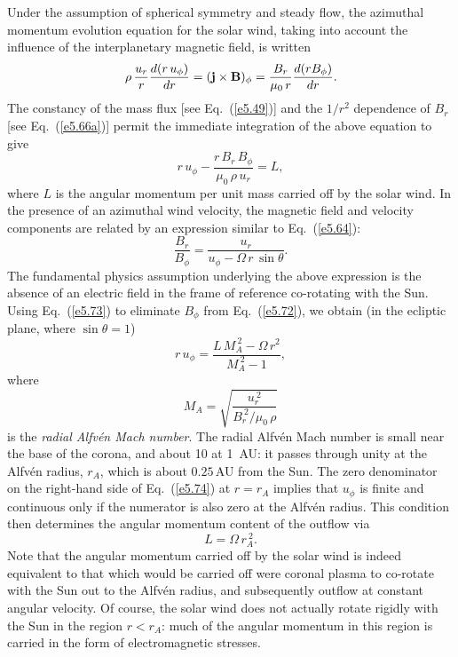 Under the assumption of spherical symmetry and steady flow, the azimuthal
momentum evolution equation for the solar wind, taking into account the
influence of the interplanetary magnetic field, is written
\begin{equation}
\rho\,\frac{u_r}{r}\frac{d(r\,u_\phi)}{dr} = ({\bf j}\times{\bf B})_\phi
= \frac{B_r}{\mu_0\,r}\frac{d(rB_\phi)}{dr}.
\end{equation}
The constancy of the mass flux [see Eq.~(\ref{e5.49})] and the $1/r^2$ dependence
of $B_r$ [see Eq.~(\ref{e5.66a})] permit the immediate integration of the
above equation to give
\begin{equation}\label{e5.72}
r\,u_\phi -\frac{r\,B_r\,B_\phi}{\mu_0\,\rho\,u_r} = L,
\end{equation}
where $L$ is the angular momentum per unit mass carried off by the solar wind.
In the presence of an azimuthal wind velocity,  the magnetic field and
velocity components are related by an expression similar to Eq.~(\ref{e5.64}):
\begin{equation}\label{e5.73}
\frac{B_r}{B_\phi} = \frac{u_r}{u_\phi - {\Omega}\,r\,\sin\theta}.
\end{equation}
The fundamental physics assumption underlying the above expression is
the absence of an electric field in the frame of reference co-rotating
with the Sun. Using Eq.~(\ref{e5.73}) to eliminate $B_\phi$ from Eq.~(\ref{e5.72}), we obtain
(in the ecliptic plane, where $\sin\theta=1$)
\begin{equation}\label{e5.74}
r\,u_\phi = \frac{L\,M_A^{~2} - {\Omega}\,r^2}{M_A^{~2} - 1},
\end{equation}
where
\begin{equation}
M_A = \sqrt{\frac{u_r^{~2}}{B_r^{~2}/\mu_0\,\rho}}
\end{equation}
is the {\em radial Alfv\'{e}n Mach number}. The radial Alfv\'{e}n Mach number
is small near the base of the corona, and about 10 at 1~AU: it passes through
unity at the Alfv\'{e}n radius, $r_A$, which is about $0.25$\,AU from the Sun.
The zero denominator on the right-hand side
of Eq.~(\ref{e5.74}) at $r=r_A$ implies that $u_\phi$ is
finite and continuous only if the numerator is also zero at the Alfv\'{e}n radius.
This condition then determines the angular momentum content of the outflow
via
\begin{equation}\label{e5.76}
L = {\Omega}\,r_A^{~2}.
\end{equation}
Note that the angular momentum carried off by the solar wind is indeed
equivalent to that which would be carried off were coronal plasma to
co-rotate with the Sun out to the Alfv\'{e}n radius, and subsequently outflow
at constant angular velocity. Of course, the solar wind does not actually
rotate rigidly with the Sun in the region $r<r_A$: much of the angular
momentum in this region is carried in the form of electromagnetic stresses. 

